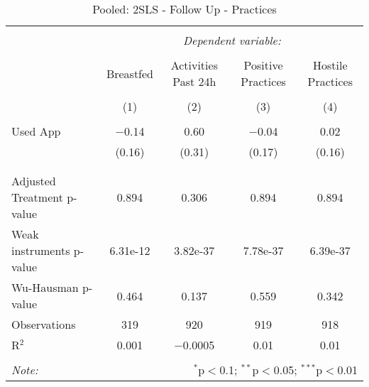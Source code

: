 
\begin{table}[!htbp] \centering 
  \caption{Pooled: 2SLS - Follow Up - Practices} 
  \label{tbl:Pooled: 2SLS - Follow Up - Practices} 
\begin{tabular}{@{\extracolsep{5pt}}lcccc} 
\\[-1.8ex]\hline 
\hline \\[-1.8ex] 
 & \multicolumn{4}{c}{\textit{Dependent variable:}} \\ 
\cline{2-5} 
\\[-1.8ex] & Breastfed & Activities Past 24h & Positive Practices & Hostile Practices \\ 
\\[-1.8ex] & (1) & (2) & (3) & (4)\\ 
\hline \\[-1.8ex] 
 Used App & $-$0.14 & 0.60 & $-$0.04 & 0.02 \\ 
  & (0.16) & (0.31) & (0.17) & (0.16) \\ 
  & & & & \\ 
\hline \\[-1.8ex] 
Adjusted Treatment p-value & 0.894 & 0.306 & 0.894 & 0.894 \\ 
Weak instruments p-value & 6.31e-12 & 3.82e-37 & 7.78e-37 & 6.39e-37 \\ 
Wu-Hausman p-value & 0.464 & 0.137 & 0.559 & 0.342 \\ 
Observations & 319 & 920 & 919 & 918 \\ 
R$^{2}$ & 0.001 & $-$0.0005 & 0.01 & 0.01 \\ 
\hline 
\hline \\[-1.8ex] 
\textit{Note:}  & \multicolumn{4}{r}{$^{*}$p$<$0.1; $^{**}$p$<$0.05; $^{***}$p$<$0.01} \\ 
\end{tabular} 
\end{table} 

